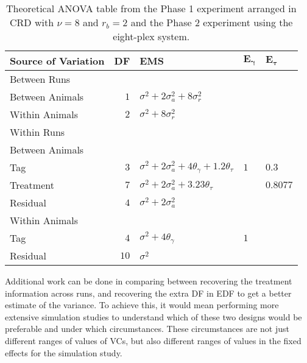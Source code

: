 \begin{table}[!ht]
\centering
 \caption{Theoretical ANOVA table from the Phase 1 experiment arranged in CRD with $\nu = 8$ and $r_b = 2$ and the Phase 2 experiment using the eight-plex system.}
 \begin{tabular}[t]{lrlll} 
 \toprule 
 \multicolumn{1}{l}{\textbf{Source of Variation}} & \multicolumn{1}{l}{\textbf{DF}} & \multicolumn{1}{l}{\textbf{EMS}}& \multicolumn{1}{l}{$\bm{E_{\gamma}}$}&\multicolumn{1}{l}{$\bm{E_{\tau}}$}\\ 
 \midrule 
 Between Runs &  &  & & \\ 
 \quad Between Animals & $1$ & $\sigma^2+2\sigma_{a}^2+8\sigma_{r}^2$ & & \\ 
 \quad Within Animals & $2$ & $\sigma^2+8\sigma_{r}^2$ & & \\ \hline 
 Within Runs &  &  & & \\ 
 \quad Between Animals &  &  & & \\ 
 \quad \quad Tag & $3$ & $\sigma^2+2\sigma_{a}^2+4\theta_{\gamma}+1.2\theta_{\tau}$ &$1$ &  $0.3$\\ 
 \quad \quad Treatment & $7$ & $\sigma^2+2\sigma_{a}^2+3.23\theta_{\tau}$ & & $0.8077$\\ 
 \quad \quad Residual & $4$ & $\sigma^2+2\sigma_{a}^2$ & & \\ \hline 
 \quad Within Animals &  &  & & \\ 
 \quad \quad Tag & $4$ & $\sigma^2+4\theta_{\gamma}$ &$1$ & \\ 
 \quad \quad Residual & $10$ & $\sigma^2$ & & \\ 
 \bottomrule 
 \end{tabular} 
 \label{tab:EDFDiscuss2}
\end{table} 

Additional work can be done in comparing between recovering the treatment information across runs, and recovering the extra DF in EDF to get a better estimate of the variance. To achieve this, it would mean performing more extensive simulation studies to understand which of these two designs would be preferable and under which circumstances. These circumstances are not just different ranges of values of VCs, but also different ranges of values in the fixed effects for the simulation study. 

